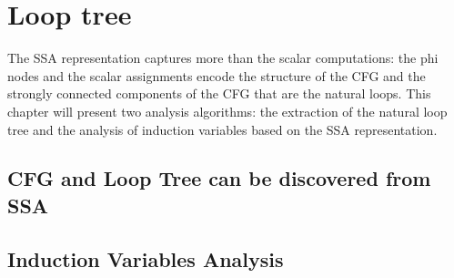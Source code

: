 \applynumberofpages\chapter{Loop tree }

The SSA representation captures more than the scalar computations: the
phi nodes and the scalar assignments encode the structure of the CFG
and the strongly connected components of the CFG that are the natural
loops.  This chapter will present two analysis algorithms: the
extraction of the natural loop tree and the analysis of induction
variables based on the SSA representation.

\section{CFG and Loop Tree can be discovered from SSA}
\section{Induction Variables Analysis}

